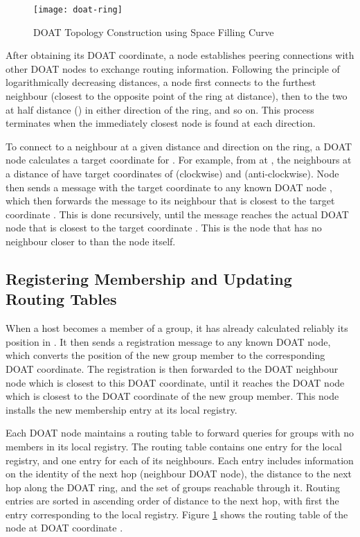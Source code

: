\begin{figure}[h]
\begin{center}
\texttt{[image: doat-ring]}
\caption{DOAT Topology Construction using Space Filling Curve}
\label{fig:doat}
\end{center}
\end{figure}


After obtaining its DOAT coordinate, a node establishes peering connections
with other DOAT nodes to exchange routing information. 
Following the principle of logarithmically decreasing
distances, a node first connects to the furthest neighbour (closest to the
opposite point of the ring at  distance), then to the two at half
distance () in either direction of the ring, and so on.
This process terminates 
when the immediately closest node is found at each direction. 

To connect to a neighbour  at a given distance and direction on the ring, 
a DOAT node  calculates a target coordinate for . For example,
from  at , the neighbours at a distance of  have target
coordinates of  (clockwise) and  (anti-clockwise).  
Node  then sends a message with the target coordinate  to any known
DOAT node 
, which then forwards the message to its
neighbour that is closest to the target coordinate .
This is done recursively, until the message reaches the actual DOAT node
 that is closest to the target coordinate . This is the node that
has no neighbour closer to  than the node itself.



\subsection{Registering Membership and Updating Routing Tables}
\label{subsect:registering}

When a host becomes a member of a group, it has already
calculated reliably its position in . It then
sends a registration message to any known DOAT node, which converts the
position of the new group member to the corresponding DOAT coordinate. 
The registration is then forwarded to the DOAT neighbour node 
which is closest to this DOAT coordinate,
until it reaches the DOAT node which is closest to the DOAT coordinate of
the new group member. This node installs the new membership entry at its
local registry.

Each DOAT node maintains a routing table to forward queries for groups
with no members in its local registry. The routing table contains one entry for
the local registry, and one entry for each of its
neighbours. Each entry includes
information on the identity of the next hop (neighbour DOAT node), the
distance to the next hop along the DOAT ring, and the set of groups
reachable through it. Routing entries are sorted in ascending
order of distance to the next hop, with first the entry corresponding
to the local registry. 
Figure \ref{fig:doat} shows the routing table of
the node at DOAT coordinate .

